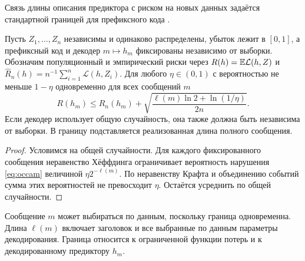 Связь длины описания предиктора с риском на новых данных задаётся стандартной
границей для префиксного кода \citep{grunwald2004,arora2018}.

\begin{proposition}
\label{prop:occam}
Пусть $Z_1,\dots,Z_n$ независимы и одинаково распределены, убыток лежит в
$[0,1]$, а префиксный код и декодер $m\mapsto h_m$ фиксированы независимо от
выборки. Обозначим популяционный и эмпирический риски через
$R(h)=\mathbb E\mathcal L(h,Z)$ и
$\widehat R_n(h)=n^{-1}\sum_{i=1}^n\mathcal L(h,Z_i)$.
Для любого $\eta\in(0,1)$ с вероятностью не меньше $1-\eta$ одновременно для всех
сообщений $m$
\begin{equation}
 R(h_m)\le\widehat R_n(h_m)
 +\sqrt{\frac{\ell(m)\ln2+\ln(1/\eta)}{2n}}.
 \label{eq:occam}
\end{equation}
Если декодер использует общую случайность, она также должна быть независима
от выборки. В границу подставляется реализованная длина полного сообщения.
\end{proposition}
\begin{proof}
Условимся на общей случайности. Для каждого фиксированного сообщения
неравенство Хёффдинга ограничивает вероятность нарушения
\eqref{eq:occam} величиной $\eta2^{-\ell(m)}$.
По неравенству Крафта и объединению событий сумма этих вероятностей не
превосходит $\eta$. Остаётся усреднить по общей случайности.
\end{proof}

Сообщение $m$ может выбираться по данным, поскольку граница одновременна.
Длина $\ell(m)$ включает заголовок и все выбранные по данным параметры
декодирования. Граница относится к ограниченной функции потерь и к
декодированному предиктору $h_m$.
